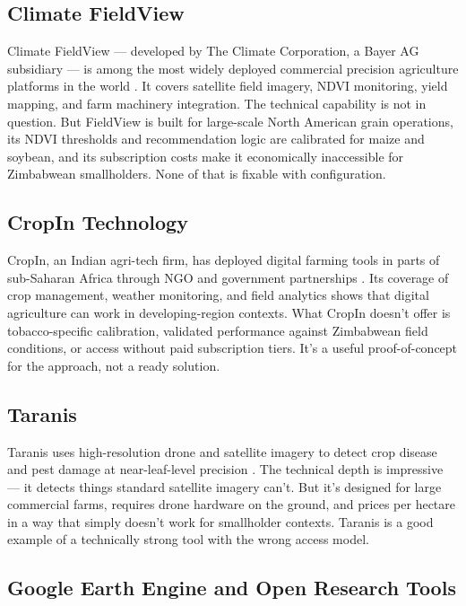 \documentclass[12pt,a4paper]{report}
\begin{document}
\subsection{Climate FieldView}

Climate FieldView — developed by The Climate Corporation, a Bayer AG subsidiary — is among the most widely deployed commercial precision agriculture platforms in the world \citep{climcorp2023}. It covers satellite field imagery, NDVI monitoring, yield mapping, and farm machinery integration. The technical capability is not in question. But FieldView is built for large-scale North American grain operations, its NDVI thresholds and recommendation logic are calibrated for maize and soybean, and its subscription costs make it economically inaccessible for Zimbabwean smallholders. None of that is fixable with configuration.

\subsection{CropIn Technology}

CropIn, an Indian agri-tech firm, has deployed digital farming tools in parts of sub-Saharan Africa through NGO and government partnerships \citep{cropin2023}. Its coverage of crop management, weather monitoring, and field analytics shows that digital agriculture can work in developing-region contexts. What CropIn doesn't offer is tobacco-specific calibration, validated performance against Zimbabwean field conditions, or access without paid subscription tiers. It's a useful proof-of-concept for the approach, not a ready solution.

\subsection{Taranis}

Taranis uses high-resolution drone and satellite imagery to detect crop disease and pest damage at near-leaf-level precision \citep{taranis2023}. The technical depth is impressive — it detects things standard satellite imagery can't. But it's designed for large commercial farms, requires drone hardware on the ground, and prices per hectare in a way that simply doesn't work for smallholder contexts. Taranis is a good example of a technically strong tool with the wrong access model.

\subsection{Google Earth Engine and Open Research Tools}
\end{document}
